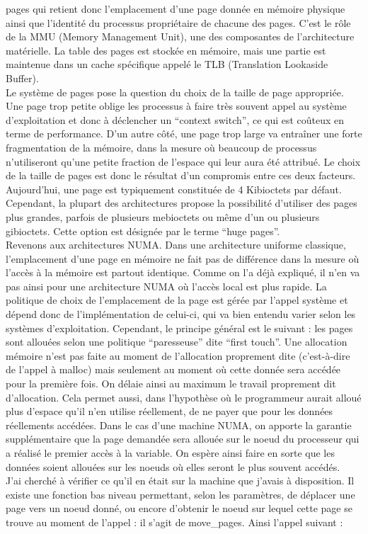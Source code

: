 \documentclass{report}
\begin{document}
pages qui retient donc l'emplacement d'une page donnée en mémoire physique ainsi que l'identité
du processus propriétaire de chacune des pages. C'est le rôle de la MMU (Memory Management Unit),
une des composantes de l'architecture matérielle. La table des pages est stockée en mémoire, mais
une partie est maintenue dans un cache spécifique appelé le TLB (Translation Lookaside Buffer).
\\Le système de pages pose la question du choix de la taille de page appropriée. Une page trop petite
oblige les processus à faire très souvent appel au système d'exploitation et donc à déclencher un
``context switch'', ce qui est coûteux en terme de performance. D'un autre côté, une page trop large
va entraîner une forte fragmentation de la mémoire, dans la mesure où beaucoup de processus 
n'utiliseront qu'une petite fraction de l'espace qui leur aura été attribué. Le choix de la taille
de pages est donc le résultat d'un compromis entre ces deux facteurs. Aujourd'hui, une page est 
typiquement constituée de 4 Kibioctets par défaut. Cependant, la plupart des architectures propose
la possibilité d'utiliser des pages plus grandes, parfois de plusieurs mebioctets ou même d'un ou
plusieurs gibioctets. Cette option est désignée par le terme ``huge pages''.
\\Revenons aux architectures NUMA. Dans une architecture uniforme classique, l'emplacement d'une
page en mémoire ne fait pas de différence dans la mesure où l'accès à la mémoire est partout identique.
Comme on l'a déjà expliqué, il n'en va pas ainsi pour une architecture NUMA où l'accès local est plus
rapide. La politique de choix de l'emplacement de la page est gérée par l'appel système et dépend
donc de l'implémentation de celui-ci, qui va bien entendu varier selon les systèmes d'exploitation.
Cependant, le principe général est le suivant : les pages sont allouées selon une politique ``paresseuse''
dite ``first touch''. Une allocation mémoire n'est pas faite au moment de l'allocation proprement dite
(c'est-à-dire de l'appel à malloc) mais seulement au moment où cette donnée sera accédée pour la première
fois. On délaie ainsi au maximum le travail proprement dit d'allocation. Cela permet aussi, dans 
l'hypothèse où le programmeur aurait alloué plus d'espace qu'il n'en utilise réellement, de ne payer que
pour les données réellements accédées. Dans le cas d'une machine NUMA, on apporte la garantie supplémentaire
que la page demandée sera allouée sur le noeud du processeur qui a réalisé le premier accès à la variable.
On espère ainsi faire en sorte que les données soient allouées sur les noeuds où elles seront le plus
souvent accédés.
\\J'ai cherché à vérifier ce qu'il en était sur la machine que j'avais à disposition. Il existe une fonction
bas niveau permettant, selon les paramètres, de déplacer une page vers un noeud donné, ou encore d'obtenir 
le noeud sur lequel cette page se trouve au moment de l'appel : il s'agit de move\_pages. Ainsi l'appel
suivant :
\end{document}
